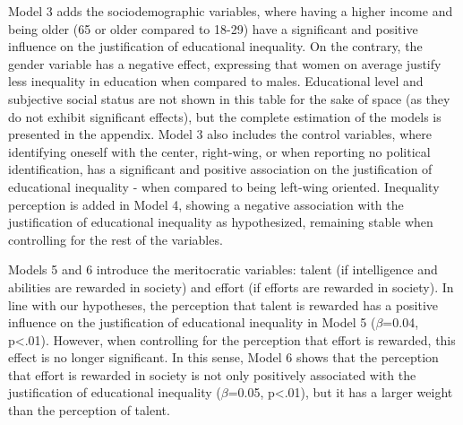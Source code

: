 \documentclass[
  12pt,
  a4paper,
]{article}
\begin{document}
Model 3 adds the sociodemographic variables, where having a higher
income and being older (65 or older compared to 18-29) have a
significant and positive influence on the justification of educational
inequality. On the contrary, the gender variable has a negative effect,
expressing that women on average justify less inequality in education
when compared to males. Educational level and subjective social status
are not shown in this table for the sake of space (as they do not
exhibit significant effects), but the complete estimation of the models
is presented in the appendix. Model 3 also includes the control
variables, where identifying oneself with the center, right-wing, or
when reporting no political identification, has a significant and
positive association on the justification of educational inequality -
when compared to being left-wing oriented. Inequality perception is
added in Model 4, showing a negative association with the justification
of educational inequality as hypothesized, remaining stable when
controlling for the rest of the variables.

Models 5 and 6 introduce the meritocratic variables: talent (if
intelligence and abilities are rewarded in society) and effort (if
efforts are rewarded in society). In line with our hypotheses, the
perception that talent is rewarded has a positive influence on the
justification of educational inequality in Model 5 (\(\beta\)=0.04,
p\textless.01). However, when controlling for the perception that effort
is rewarded, this effect is no longer significant. In this sense, Model
6 shows that the perception that effort is rewarded in society is not
only positively associated with the justification of educational
inequality (\(\beta\)=0.05, p\textless.01), but it has a larger weight
than the perception of talent.
\end{document}
